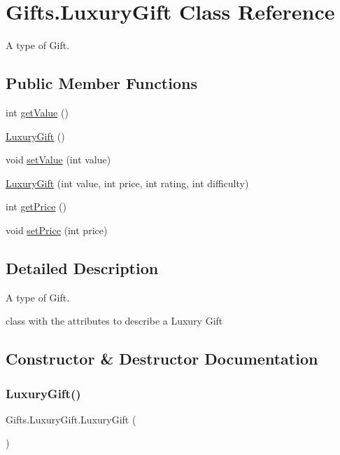 \hypertarget{class_gifts_1_1_luxury_gift}{}\section{Gifts.\+Luxury\+Gift Class Reference}
\label{class_gifts_1_1_luxury_gift}


A type of Gift.  


\subsection*{Public Member Functions}
\begin{DoxyCompactItemize}
\item 
int \hyperlink{class_gifts_1_1_luxury_gift_a184a1c62b7d9cecad3ff93dc37e95eb0}{get\+Value} ()
\item 
\hyperlink{class_gifts_1_1_luxury_gift_adbd87e281e4dd7844ec4e6ad4b43d70d}{Luxury\+Gift} ()
\item 
void \hyperlink{class_gifts_1_1_luxury_gift_accae65e1f413331ff5747aedeee70792}{set\+Value} (int value)
\item 
\hyperlink{class_gifts_1_1_luxury_gift_a6dda4fb2238c7b624d5fcf4fd723b91a}{Luxury\+Gift} (int value, int price, int rating, int difficulty)
\item 
int \hyperlink{class_gifts_1_1_luxury_gift_a73fe2266d10b55ab00665ebbf4e59f4e}{get\+Price} ()
\item 
void \hyperlink{class_gifts_1_1_luxury_gift_aee295d3da2f8a2f38a958cc20ea50ab4}{set\+Price} (int price)
\end{DoxyCompactItemize}


\subsection{Detailed Description}
A type of Gift. 

class with the attributes to describe a Luxury Gift 

\subsection{Constructor \& Destructor Documentation}
\mbox{\label{class_gifts_1_1_luxury_gift_adbd87e281e4dd7844ec4e6ad4b43d70d}} 
\subsubsection{\texorpdfstring{Luxury\+Gift()}{LuxuryGift()}\hspace{0.1cm}{\footnotesize\ttfamily [1/2]}}
{\footnotesize\ttfamily Gifts.\+Luxury\+Gift.\+Luxury\+Gift (\begin{DoxyParamCaption}{ }\end{DoxyParamCaption})\hspace{0.3cm}{\ttfamily [inline]}}


